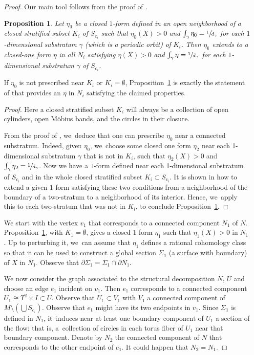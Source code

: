 \documentclass[11pt]{article}
\newtheorem{prop}[theorem]{Proposition}
\theoremstyle{definition}
\begin{document}
\begin{proof}
Our main tool follows from the proof of \cite[Prop.\,2.8]{CV2}.

\begin{prop}\label{prop:CV2}
Let $\eta_0$ be a closed $1$-form defined in an open neighborhood of a closed stratified subset $K_i$ of $S_{c_i}$ such that $\eta_0(X)>0$ and $\int_{\gamma}\eta_0=\sfrac{1}{d_{\gamma}}$ for each $1$-dimensional substratum $\gamma$ (which is a periodic orbit) of $K_i$. Then $\eta_0$ extends to a closed-one form $\eta$ in all $N_i$ satisfying $\eta(X)>0$ and $\int_{\gamma} \eta=\sfrac{1}{d_{\gamma}}$ for each $1$-dimensional substratum $\gamma$ of $S_{c_i}$.
\end{prop}

If $\eta_0$ is not prescribed near $K_i$ or $K_i=\emptyset$, Proposition~\ref{prop:CV2} is exactly the statement of \cite[Prop.\,2.8]{CV2} that provides an $\eta$ in $N_i$ satisfying the claimed properties.

\begin{proof}
Here a closed stratified subset $K_i$ will always be a collection of open cylinders, open Möbius bands, and the circles in their closure.\enlargethispage{.5\baselineskip}%

From the proof of \cite[Prop.\,2.8]{CV2}, we~deduce that one can prescribe $\eta_0$ near a connected substratum. Indeed, given $\eta_0$, we~choose some closed one form $\eta_2$ near each 1-dimensional substratum $\gamma$ that is not in $K_i$, such that $\eta_2(X)>0$ and $\int_{\gamma}\eta_2=\sfrac{1}{d_{\gamma}}$. Now we have a $1$-form defined near each 1-dimensional substratum of $S_{c_i}$ and in the whole closed stratified subset $K_i\subset S_{c_i}$. It is shown in \cite[\S 2, p.\,463--464]{CV2} how to extend a given $1$-form satisfying these two conditions from a neighborhood of the boundary of a two-stratum to a neighborhood of its interior. Hence, we~apply this to each two-stratum that was not in $K_i$, to conclude Proposition~\ref{prop:CV2}.
\end{proof}

We start with the vertex $v_1$ that corresponds to a connected component $N_1$ of $N$. Proposition~\ref{prop:CV2}, with $K_1=\emptyset$, gives a closed $1$-form $\eta_1$ such that $\eta_1(X)>0$ in $N_1$. Up to perturbing it, we~can assume that $\eta_1$ defines a rational cohomology class so that it can be used to construct a global section $\Sigma_1$ (a surface with boundary) of $X$ in $N_1$. Observe that $\partial\Sigma_1=\Sigma_1\cap \partial N_1$.

We now consider the graph associated to the structural decomposition $N$, $U$ and choose an edge $e_1$ incident on $v_1$. Then $e_1$ corresponds to a connected component $U_1\cong T^2\times I\subset U$. Observe that $U_1\subset V_1$ with $V_1$ a connected component of $M\setminus \left( \bigcup S_{c_i} \right)$. Observe that $e_1$ might have its two endpoints in $v_1$. Since $\Sigma_1$ is defined in $N_1$, it~induces near at least one boundary component of $U_1$ a section of the flow: that is, a~collection of circles in each torus fiber of $U_1$ near that boundary component. Denote by $N_2$ the connected component of $N$ that corresponds to the other endpoint of $e_1$. It could happen that $N_2=N_1$.


\end{proof}
\end{document}
